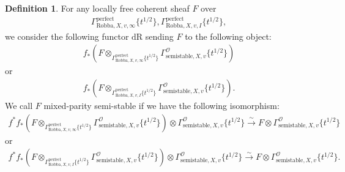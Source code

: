\documentclass[12pt]{book}
\theoremstyle{definition}
\newtheorem{definition}{Definition}
\begin{document}
\begin{definition}
For any locally free coherent sheaf $F$ over
\begin{align}
\Gamma^\mathrm{perfect}_{\text{Robba},X,v,\infty}\{t^{1/2}\},\Gamma^\mathrm{perfect}_{\text{Robba},X,v,I}\{t^{1/2}\},
\end{align} 
we consider the following functor $\mathrm{dR}$ sending $F$ to the following object:
\begin{align}
f_*(F\otimes_{\Gamma^\mathrm{perfect}_{\text{Robba},X,v,\infty}\{t^{1/2}\}} \Gamma^\mathcal{O}_{\text{semistable},X,v}\{t^{1/2}\})
\end{align}
or 
\begin{align}
f_*(F\otimes_{\Gamma^\mathrm{perfect}_{\text{Robba},X,v,I}\{t^{1/2}\}} \Gamma^\mathcal{O}_{\text{semistable},X,v}\{t^{1/2}\}).
\end{align}
We call $F$ mixed-parity semi-stable if we have the following isomorphism:
\begin{align}
f^*f_*(F\otimes_{\Gamma^\mathrm{perfect}_{\text{Robba},X,v,\infty}\{t^{1/2}\}} \Gamma^\mathcal{O}_{\text{semistable},X,v}\{t^{1/2}\}) \otimes \Gamma^\mathcal{O}_{\text{semistable},X,v}\{t^{1/2}\} \overset{\sim}{\longrightarrow} F \otimes \Gamma^\mathcal{O}_{\text{semistable},X,v}\{t^{1/2}\} 
\end{align}
or 
\begin{align}
f^*f_*(F\otimes_{\Gamma^\mathrm{perfect}_{\text{Robba},X,v,I}\{t^{1/2}\}} \Gamma^\mathcal{O}_{\text{semistable},X,v}\{t^{1/2}\}) \otimes \Gamma^\mathcal{O}_{\text{semistable},X,v}\{t^{1/2}\} \overset{\sim}{\longrightarrow} F \otimes \Gamma^\mathcal{O}_{\text{semistable},X,v}\{t^{1/2}\}. 
\end{align}
\end{definition}
\end{document}
